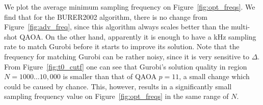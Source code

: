 \documentclass[prb,reprint,nofootinbib,longbibliography,superscriptaddress]{revtex4-1}
\begin{document}
We plot the average minimum sampling frequency on Figure~\ref{fig:opt_freqs}. 
We find that for the BURER2002 algorithm, there is no change from Figure~\ref{fig:adv_freq}, since this algorithm 
always scales better than the multi-shot QAOA. On the other hand, apparently it is enough to have a kHz sampling rate to 
match Gurobi before it starts to improve its solution. 
Note that the frequency for matching Gurobi can be rather noisy, since it is very sensitive to $\Delta$. From Figure~\ref{fig:t0_cutf} one can see that Gurobi's solution quality in region $N=1000\dots10,000$ is smaller than that of QAOA $p=11$, a small change which could be caused by chance. This, however, results in a significantly small sampling frequency value on Figure~\ref{fig:opt_freqs} in the same range of $N$.
\end{document}
